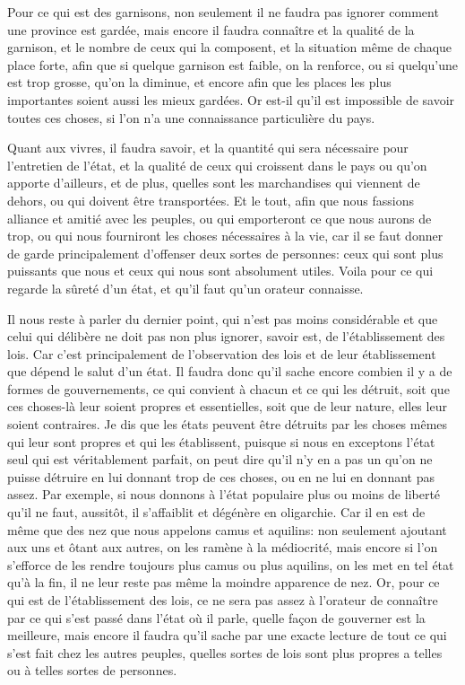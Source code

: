 Pour ce qui est des garnisons, non seulement il ne faudra pas ignorer comment une province est gardée, mais encore il faudra connaître
et la qualité de la garnison, et le nombre de ceux qui la composent, et la situation même de chaque place forte, afin que si quelque
garnison est faible, on la renforce, ou si quelqu'une est trop grosse, qu'on la diminue, et encore afin que les places les plus
importantes soient aussi les mieux gardées. Or est-il qu'il est impossible de savoir toutes ces choses, si l'on n'a une connaissance
particulière du pays.

Quant aux vivres, il faudra savoir, et la quantité qui sera nécessaire pour l'entretien de l'état, et la qualité de ceux qui croissent
dans le pays ou qu'on apporte d'ailleurs, et de plus, quelles sont les marchandises qui viennent de dehors, ou qui doivent être transportées.
Et le tout, afin que nous fassions alliance et amitié avec les peuples, ou qui emporteront ce que nous aurons de trop, ou qui nous fourniront
les choses nécessaires à la vie, car il se faut donner de garde principalement d'offenser deux sortes de personnes: ceux qui sont plus
puissants que nous et ceux qui nous sont absolument utiles. Voila pour ce qui regarde la sûreté d'un état, et qu'il faut qu'un orateur connaisse.

\bigbreak

Il nous reste à parler du dernier point, qui n'est pas moins considérable et que celui qui délibère ne doit pas non plus ignorer, savoir est,
de l'établissement des lois. Car c'est principalement de l'observation des lois et de leur établissement que dépend le salut d'un état. Il
faudra donc qu'il sache encore combien il y a de formes de gouvernements, ce qui convient à chacun et ce qui les détruit, soit que ces choses-là
leur soient propres et essentielles, soit que de leur nature, elles leur soient contraires. Je dis que les états peuvent être détruits par les
choses mêmes qui leur sont propres et qui les établissent, puisque si nous en exceptons l'état seul qui est véritablement parfait, on peut dire
qu'il n'y en a pas un qu'on ne puisse détruire en lui donnant trop de ces choses, ou en ne lui en donnant pas assez. Par exemple, si nous
donnons à l'état populaire plus ou moins de liberté qu'il ne faut, aussitôt, il s'affaiblit et dégénère en oligarchie. Car il en est de même que
des nez que nous appelons camus et aquilins: non seulement ajoutant aux uns et ôtant aux autres, on les ramène à la médiocrité, mais encore si
l'on s'efforce de les rendre toujours plus camus ou plus aquilins, on les met en tel état qu'à la fin, il ne leur reste pas même la moindre
apparence de nez. Or, pour ce qui est de l'établissement des lois, ce ne sera pas assez à l'orateur de connaître par ce qui s'est passé dans l'état
où il parle, quelle façon de gouverner est la meilleure, mais encore il faudra qu'il sache par une exacte lecture de tout ce qui s'est fait chez
les autres peuples, quelles sortes de lois sont plus propres a telles ou à telles sortes de personnes.

